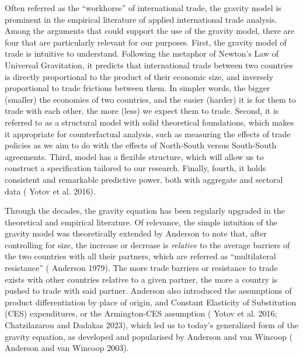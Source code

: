 Often referred as the ``workhorse'' of international trade, the gravity
model is prominent in the empirical literature of applied international
trade analysis. Among the arguments that could support the use of the
gravity model, there are four that are particularly relevant for our
purposes. First, the gravity model of trade is intuitive to understand.
Following the metaphor of Newton's Law of Universal Gravitation, it
predicts that international trade between two countries is directly
proportional to the product of their economic size, and inversely
proportional to trade frictions between them. In simpler words, the
bigger (smaller) the economies of two countries, and the easier (harder)
it is for them to trade with each other, the more (less) we expect them
to trade. Second, it is referred to as a structural model with solid
theoretical foundations, which makes it appropriate for counterfactual
analysis, such as measuring the effects of trade policies as we aim to
do with the effects of North-South versus South-South agreements. Third,
model has a flexible structure, which will allow us to construct a
specification tailored to our research. Finally, fourth, it holds
consistent and remarkable predictive power, both with aggregate and
sectoral data (\cite{yotov_advanced_2016} Yotov et al. 2016).

Through the decades, the gravity equation has been regularly upgraded in
the theoretical and empirical literature. Of relevance, the simple
intuition of the gravity model was theoretically extended by Anderson to
note that, after controlling for size, the increase or decrease is
\emph{relative} to the average barriers of the two countries with all
their partners, which are referred as ``multilateral resistance''
(\cite{anderson_theoretical_1979} Anderson 1979). The more trade barriers or resistance to trade exists
with other countries relative to a given partner, the more a country is
pushed to trade with said partner. Anderson also introduced the
assumptions of product differentiation by place of origin, and Constant
Elasticity of Substitution (CES) expenditures, or the Armington-CES
assumption (\cite{yotov_advanced_2016} Yotov et al. 2016; \cite{chatzilazarou_trade_2023} Chatzilazarou and Dadakas 2023), which
led us to today's generalized form of the gravity equation, as developed
and popularised by Anderson and van Wincoop (\cite{anderson_gravity_2003} Anderson and van Wincoop
2003).

